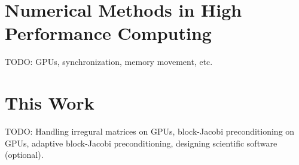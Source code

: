 




\section{Numerical Methods in High Performance Computing}
TODO: GPUs, synchronization, memory movement, etc.

\section{This Work}
TODO: Handling irregural matrices on GPUs, block-Jacobi preconditioning on GPUs,
      adaptive block-Jacobi preconditioning, designing scientific software
      (optional).
